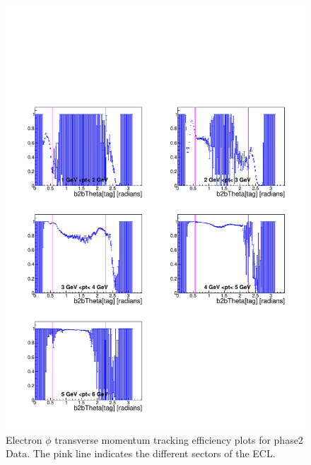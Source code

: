 \documentclass[a4paper,11pt,twosided,final,german,openbib,pdftex,listof=totoc,bibliography=totoc]{scrbook}
\begin{document}
\begin{appendix}
\begin{figure}[!htbp]
	\centering
	\includegraphics[width=\textwidth]{Plots/master/xPtMThetaem_Data}
	\caption[Transverse Momentum $\theta$ Electron Efficiency Phase2 Data]{Electron $\phi$ transverse momentum tracking efficiency plots for phase2 Data. The pink line indicates the different sectors of the ECL.}
	\label{plt:PtMThetaem_Data}
\end{figure}



\end{appendix}
\end{document}
